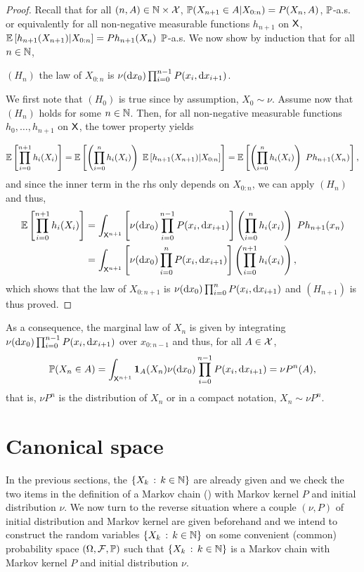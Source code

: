 \documentclass[english,graybox,envcountchap,envcountsame,sectrefs,shortlabels]{svmono}
\theoremstyle{style}
\begin{document}
\begin{proof}
Recall that for all $(n,A)\in\mathbb{N}\times\mathcal{X}$, $\mathbb{P}(X_{n+1}\in A|X_{0:n})=P(X_{n},A)$,
$\mathbb{P}$-a.s. or equivalently for all non-negative measurable functions
$h_{n+1}$ on $\mathsf{X}$, $\mathbb{E}\left[h_{n+1}(X_{n+1})|X_{0:n}\right]=Ph_{n+1}(X_{n})$ $\mathbb{P}$-a.s.
We now show by induction that for all $n\in\mathbb{N}$,
\begin{center}
$(H_{n})$ the law of $X_{0:n}$ is $\nu(\mathrm{d} x_{0})\prod_{i=0}^{n-1}P(x_{i},\mathrm{d} x_{i+1})$.
\par\end{center}
We first note that $(H_{0})$ is true since by assumption, $X_{0}\sim\nu$.
Assume now that $(H_{n})$ holds for some $n\in\mathbb{N}$. Then, for
all non-negative measurable functions $h_{0},\ldots,h_{n+1}$ on $\mathsf{X}$,
the tower property yields

\[
\PE\left[\prod_{i=0}^{n+1}h_{i}(X_{i})\right]=\PE\left[\left(\prod_{i=0}^{n}h_{i}(X_{i})\right)\ \PE\left[h_{n+1}(X_{n+1})|X_{0:n}\right]\right]=\PE\left[\left(\prod_{i=0}^{n}h_{i}(X_{i})\right)\ Ph_{n+1}(X_{n})\right],
\]
 and since the inner term in the rhs only depends on $X_{0:n}$, we
can apply $(H_{n})$ and thus,
\begin{align*}
\PE\left[\prod_{i=0}^{n+1}h_{i}(X_{i})\right] & =\int_{\Xset^{n+1}}\left[\nu(\rmd x_{0})\prod_{i=0}^{n-1}P(x_{i},\rmd x_{i+1})\right]\left(\prod_{i=0}^{n}h_{i}(x_{i})\right)\ Ph_{n+1}(x_{n})\\
 & =\int_{\Xset^{n+1}}\left[\nu(\rmd x_{0})\prod_{i=0}^{n}P(x_{i},\rmd x_{i+1})\right]\left(\prod_{i=0}^{n+1}h_{i}(x_{i})\right),
\end{align*}
which shows that the law of $X_{0:n+1}$ is $\nu(\mathrm{d} x_{0})\prod_{i=0}^{n}P(x_{i},\mathrm{d} x_{i+1})$
and $\left(H_{n+1}\right)$ is thus proved.
\end{proof}
As a consequence, the marginal law of $X_{n}$ is given by integrating
$\nu(\mathrm{d} x_{0})\prod_{i=0}^{n-1}P(x_{i},\mathrm{d} x_{i+1})$ over $x_{0:n-1}$
and thus, for all $A\in\mathcal{X}$,
\[
\mathbb{P}(X_{n}\in A)=\int_{\mathsf{X}^{n+1}}\mathbf{1}_{A}(X_{n})\nu(\mathrm{d} x_{0})\prod_{i=0}^{n-1}P(x_{i},\mathrm{d} x_{i+1})=\nu P^{n}(A),
\]
 that is, $\nu P^{n}$ is the distribution of $X_{n}$ or in a compact
notation, $X_{n}\sim\nu P^{n}$.

\section{Canonical space} 

In the previous sections, the $\left\{ X_{k}\,:\,k\in\mathbb{N}\right\}$
are already given and we check the two items in the definition of
a Markov chain () with Markov kernel $P$ and initial
distribution $\nu$. We now turn to the reverse situation where a
couple $(\nu,P)$  of initial distribution and Markov kernel are given
beforehand and we intend to construct the random variables $\left\{ X_{k}\,:\,k\in\mathbb{N}\right\}$
on some convenient (common) probability space $(\Omega,\mathcal{F},\mathbb{P})$
such that $\left\{ X_{k}\,:\,k\in\mathbb{N}\right\}$ is a Markov chain with Markov
kernel $P$ and initial distribution $\nu$.
\end{document}
